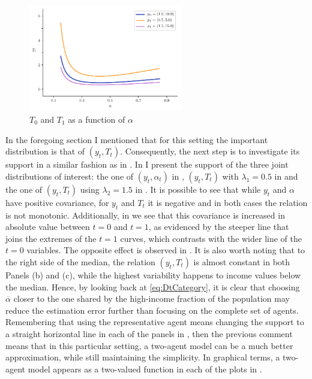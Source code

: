 \documentclass[english, a4paper, 12pt]{article}
\begin{document}
	\begin{figure}
		\caption{$T_{0}$ and $T_{1}$ as a function of $\alpha$}
		\label{fig:DiffTtLambda}
		\includegraphics[width = 0.6\textwidth]{TtLambdas}
		\vspace{-1.5ex}
	\end{figure}
In the foregoing section I mentioned that for this setting the important distribution is that of $(y_{t}, T_{t})$. Consequently, the next step is to investigate its support in a similar fashion as in . In  I present the support of the three joint distributions of interest: the one of $(y_{t}, \alpha_{t})$ in , $(y_{t}, T_{t})$ with $\lambda_{1} = 0.5$ in  and the one of $(y_{t}, T_{t})$ using $\lambda_{2} = 1.5$ in . It is possible to see that while $y_{t}$ and $\alpha$ have positive covariance, for $y_{t}$ and $T_{t}$ it is negative and in both cases the relation is not monotonic. Additionally, in  we see that this covariance is increased in absolute value between $t = 0$ and $t = 1$, as evidenced by the steeper line that joins the extremes of the $t=1$ curves, which contrasts with the wider line of the $t=0$ variables. The opposite effect is observed in . It is also worth noting that to the right side of the median, the relation $(y_{t}, T_{t})$ is almost constant in both Panels (b) and (c), while the highest variability happens to income values below the median. Hence, by looking back at \eqref{eq:DtCategory}, it is clear that choosing $\overline{\alpha}$ closer to the one shared by the high-income fraction of the population may reduce the estimation error further than focusing on the complete set of agents. Remembering that using the representative agent means changing the support to a straight horizontal line in each of the panels in , then the previous comment means that in this particular setting, a two-agent model can be a much better approximation, while still maintaining the simplicity. In graphical terms, a two-agent model appears as a two-valued function in each of the plots in .
\end{document}
